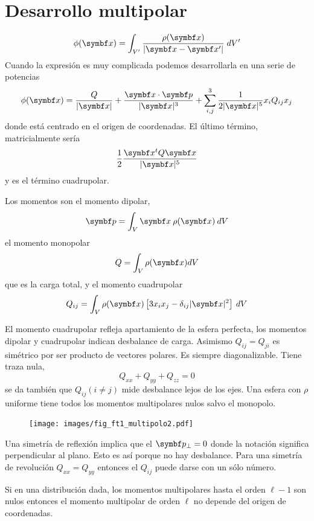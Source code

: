 \documentclass[10pt,oneside]{CBFT_book}
\begin{document}
\section{Desarrollo multipolar}

\[
	\phi(\vb{x}) = \int_{V'} \frac{\rho(\vb{x})}{|\vb{x}-\vb{x}'|} \; dV'
\]
Cuando la expresión es muy complicada podemos desarrollarla en una serie de potencias
\[
	\phi(\vb{x}) = \frac{Q}{|\vb{x}|} + \frac{\vb{x}\cdot\vb{p}}{|\vb{x}|^3} +
	\sum_{i,j}^3 \frac{1}{2|\vb{x}|^5} x_i Q_{ij} x_j
\]
donde está centrado en el origen de coordenadas. El último término, matricialmente sería
\[
	\frac{1}{2} \frac{\vb{x}^t Q \vb{x}}{|\vb{x}|^5}
\]
y es el término cuadrupolar.

Los momentos son el momento dipolar,
\[
	\vb{p} = \int_V \vb{x} \: \rho(\vb{x}) \: dV
\]
el momento monopolar
\[
	Q = \int_V \rho(\vb{x}) dV
\]
que es la carga total, y el momento cuadrupolar
\[
	Q_{ij} = \int_V  \rho(\vb{x}) \left[ 3 x_i x_j - \delta_{ij} |\vb{x}|^2 \right] \: dV
\]

El momento cuadrupolar refleja apartamiento de la esfera perfecta, los momentos dipolar y cuadrupolar
indican desbalance de carga.
Asimismo $Q_{ij} = Q_{ji}$ es simétrico por ser producto de vectores polares.
Es siempre diagonalizable. Tiene traza nula,
\[
	Q_{xx} + Q_{yy} + Q_{zz}  = 0
\]
se da también que $Q_{ij} (i\neq j)$ mide desbalance lejos de los ejes.
Una esfera con $\rho$ uniforme tiene todos los momentos multipolares nulos salvo el monopolo.

\begin{figure}[htb]
	\begin{center}
	\texttt{[image: images/fig\_ft1\_multipolo2.pdf]}	 
	\end{center}
	\caption{}
\end{figure}

Una simetría de reflexión implica que el $\vb{p}_\perp = 0$ donde la notación significa perpendicular
al plano. Esto es así porque no hay desbalance. Para una simetría de revolución $Q_{xx}=Q_{yy}$ entonces
el $Q_{ij}$ puede darse con un sólo número.

Si en una distribución dada, los momentos multipolares hasta el orden $\ell -1$ son nulos entonces
el momento multipolar de orden $\ell$ no depende del origen de coordenadas.
\end{document}
